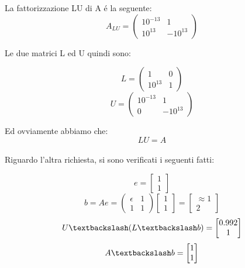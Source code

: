 \begin{center}
\footnotesize\noindent{}\end{center}

\noindent La fattorizzazione LU di A \'e la seguente:
\[
A_{LU} = \begin{pmatrix} 10^{-13} & 1 \\ 10^{13} & -10^{13}\end{pmatrix}
\]

\noindent Le due matrici L ed U quindi sono:

\[
L = \begin{pmatrix} 1 & 0 \\ 10^{13} & 1\end{pmatrix}\]
\[
U = \begin{pmatrix} 10^{-13} & 1 \\ 0 & -10^{13}\end{pmatrix}
\]

\noindent Ed ovviamente abbiamo che:
\[
LU = A
\]
\\

\noindent Riguardo l'altra richiesta, si sono verificati i seguenti fatti:

\[
e = \begin{bmatrix} 1 \\ 1\end{bmatrix}
\]
\[
b = Ae = \begin{pmatrix} \epsilon & 1 \\ 1 & 1 \end{pmatrix} \begin{bmatrix} 1 \\ 1\end{bmatrix} = \begin{bmatrix} \approx 1 \\ 2 \end{bmatrix}
\]
\[
U \textbackslash (L \textbackslash b) = \begin{bmatrix} 0.992 \\ 1\end{bmatrix}
\]
\[
A \textbackslash b = \begin{bmatrix} 1 \\ 1\end{bmatrix}
\]

